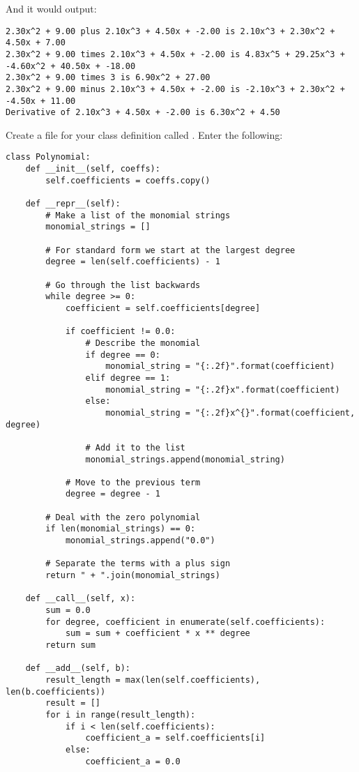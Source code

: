 And it would output:
\begin{Verbatim}
2.30x^2 + 9.00 plus 2.10x^3 + 4.50x + -2.00 is 2.10x^3 + 2.30x^2 + 4.50x + 7.00
2.30x^2 + 9.00 times 2.10x^3 + 4.50x + -2.00 is 4.83x^5 + 29.25x^3 + -4.60x^2 + 40.50x + -18.00
2.30x^2 + 9.00 times 3 is 6.90x^2 + 27.00
2.30x^2 + 9.00 minus 2.10x^3 + 4.50x + -2.00 is -2.10x^3 + 2.30x^2 + -4.50x + 11.00
Derivative of 2.10x^3 + 4.50x + -2.00 is 6.30x^2 + 4.50  
\end{Verbatim}

Create a file for your class definition called . Enter the following:
\begin{Verbatim}
class Polynomial:
    def __init__(self, coeffs):
        self.coefficients = coeffs.copy()

    def __repr__(self):
        # Make a list of the monomial strings
        monomial_strings = []

        # For standard form we start at the largest degree
        degree = len(self.coefficients) - 1

        # Go through the list backwards
        while degree >= 0:
            coefficient = self.coefficients[degree]

            if coefficient != 0.0:
                # Describe the monomial
                if degree == 0:
                    monomial_string = "{:.2f}".format(coefficient)
                elif degree == 1:
                    monomial_string = "{:.2f}x".format(coefficient)
                else:
                    monomial_string = "{:.2f}x^{}".format(coefficient, degree)
                
                # Add it to the list
                monomial_strings.append(monomial_string)
        
            # Move to the previous term
            degree = degree - 1

        # Deal with the zero polynomial
        if len(monomial_strings) == 0:
            monomial_strings.append("0.0")
    
        # Separate the terms with a plus sign
        return " + ".join(monomial_strings)

    def __call__(self, x):
        sum = 0.0  
        for degree, coefficient in enumerate(self.coefficients):
            sum = sum + coefficient * x ** degree
        return sum

    def __add__(self, b):
        result_length = max(len(self.coefficients), len(b.coefficients))
        result = []
        for i in range(result_length):
            if i < len(self.coefficients):
                coefficient_a = self.coefficients[i]
            else:
                coefficient_a = 0.0


\end{Verbatim}
